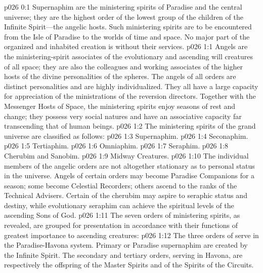 \author{Perfector of Wisdom}
\vs p026 0:1 Supernaphim are the ministering spirits of Paradise and the central universe; they are the highest order of the lowest group of the children of the Infinite Spirit---the angelic hosts. Such ministering spirits are to be encountered from the Isle of Paradise to the worlds of time and space. No major part of the organized and inhabited creation is without their services.\plusone
{}
\vs p026 1:1 Angels are the ministering\hyp{}spirit associates of the evolutionary and ascending will creatures of all space; they are also the colleagues and working associates of the higher hosts of the divine personalities of the spheres. The angels of all orders are distinct personalities and are highly individualized. They all have a large capacity for appreciation of the ministrations of the reversion directors. Together with the Messenger Hosts of Space, the ministering spirits enjoy seasons of rest and change; they possess very social natures and have an associative capacity far transcending that of human beings.
\pc \vs p026 1:2 The ministering spirits of the grand universe are classified as follows:
\pc \vs p026 1:3 \bibnobreakspace Supernaphim.
\vs p026 1:4 \bibnobreakspace Seconaphim.
\vs p026 1:5 \bibnobreakspace Tertiaphim.
\vs p026 1:6 \bibnobreakspace Omniaphim.
\vs p026 1:7 \bibnobreakspace Seraphim.
\vs p026 1:8 \bibnobreakspace Cherubim and Sanobim.
\vs p026 1:9 \bibnobreakspace Midway Creatures.
\pc \vs p026 1:10 The individual members of the angelic orders are not altogether stationary as to personal status in the universe. Angels of certain orders may become Paradise Companions for a season; some become Celestial Recorders; others ascend to the ranks of the Technical Advisers. Certain of the cherubim may aspire to seraphic status and destiny, while evolutionary seraphim can achieve the spiritual levels of the ascending Sons of God.
\pc \vs p026 1:11 The seven orders of ministering spirits, as revealed, are grouped for presentation in accordance with their functions of greatest importance to ascending creatures:
\pc \vs p026 1:12 \bibnobreakspace {} The three orders of  serve in the Paradise\hyp{}Havona system. Primary or Paradise supernaphim are created by the Infinite Spirit. The secondary and tertiary orders, serving in Havona, are respectively the offspring of the Master Spirits and of the Spirits of the Circuits.
